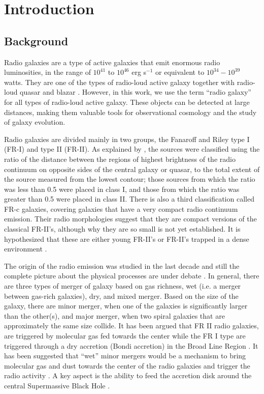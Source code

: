 \chapter{Introduction}

\section{Background}
Radio galaxies are a type of active galaxies that emit enormous radio luminosities, in the range of $10^{41}$ to $10^{46}$ erg s$^{-1}$ or equivalent to $10^{34}-10^{39}$ watts. They are one of the types of radio-loud active galaxy together with radio-loud quasar and blazar \citep{miley2008}. However, in this work, we use the  term ``radio galaxy'' for all types of radio-loud active galaxy. These objects can be detected at large distances, making them valuable tools for observational cosmology and the study of galaxy evolution.

Radio galaxies are divided mainly in two groups, the Fanaroff and Riley type I (FR-I) and type II (FR-II). As explained by \cite{fanaroff1974}, the sources were classified using the ratio of the distance between the regions of highest brightness of the radio continuum on opposite sides of the central galaxy or quasar, to the total extent of the source measured from the lowest contour; those sources from which the ratio was less than 0.5 were placed in class I, and those from which the ratio was greater than 0.5 were placed in class II. There is also a third classification called FR-c galaxies, covering galaxies that have a very compact radio continuum emission. Their radio morphologies suggest that they are compact versions of the classical FR-II's, although why they are so small is not yet established. It is hypothesized that these are either young FR-II's or FR-II's trapped in a dense environment \citep[e.g.][]{fanti1990, odea1991, fanti1994}.

The origin of the radio emission was studied in the last decade and still the complete picture about the physical processes are under debate \citep[e.g.][]{sikora1997, merloni2007, moderski1998}. In general, there are three types of merger of galaxy based on gas richness, wet (i.e. a merger between gas-rich galaxies), dry, and mixed merger. Based on the size of the galaxy, there are minor merger, when one of the galaxies is significantly larger than the other(s), and major merger, when two spiral galaxies that are approximately the same size collide. It has been argued that FR II radio galaxies, are triggered by molecular gas fed towards the center \citep{buttiglione2010} while the FR I type are triggered through a dry accretion (Bondi accretion) in the Broad Line Region \citep[BLR, see][]{fromerth2001}. It has been suggested that ``wet'' minor mergers would be a mechanism to bring molecular gas and dust towards the center of the radio galaxies and trigger the radio activity \citep[see, for example,][]{lim2000, israel1998}. A key aspect is the ability to feed the accretion disk around the central Supermassive Black Hole \citep[SMBH, see][]{merloni2008}.
 
